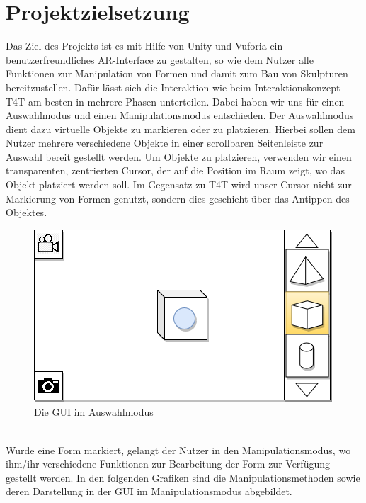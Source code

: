 \documentclass[12pt,a4paper, oneside]{scrartcl}
\begin{document}



\newpage




\section{Projektzielsetzung}
Das Ziel des Projekts ist es mit Hilfe von Unity und Vuforia ein benutzerfreundliches AR-Interface zu gestalten, so wie dem Nutzer alle Funktionen zur Manipulation von Formen und damit zum Bau von Skulpturen bereitzustellen.
Dafür lässt sich die Interaktion wie beim Interaktionskonzept T4T am besten in mehrere Phasen unterteilen. Dabei haben wir uns für einen Auswahlmodus und einen Manipulationsmodus entschieden. Der Auswahlmodus dient dazu virtuelle Objekte zu markieren oder zu platzieren. Hierbei sollen dem Nutzer mehrere verschiedene Objekte in einer scrollbaren Seitenleiste zur Auswahl bereit gestellt werden. Um Objekte zu platzieren, verwenden wir einen transparenten, zentrierten Cursor, der auf die Position im Raum zeigt, wo das Objekt platziert werden soll. Im Gegensatz zu T4T wird unser Cursor nicht zur Markierung von Formen genutzt, sondern dies geschieht über das Antippen des Objektes.
\begin{figure}[h!]
\includegraphics[scale=0.5]{GUIAuswahlmodus}
\caption{Die GUI im Auswahlmodus}
\label{figure_GUI_A}
\end{figure}
%
\\
%
Wurde eine Form markiert, gelangt der Nutzer in den Manipulationsmodus, wo ihm/ihr verschiedene Funktionen zur Bearbeitung der Form zur Verfügung gestellt werden. In den folgenden Grafiken sind die Manipulationsmethoden sowie deren Darstellung in der GUI im Manipulationsmodus abgebildet. 
\end{document}
